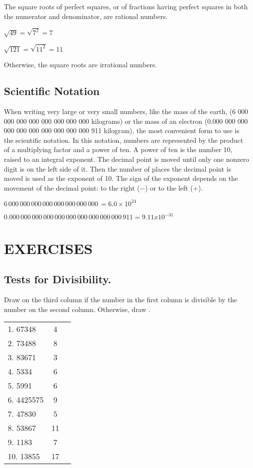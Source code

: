 The square roots of perfect squares, or of fractions having perfect squares in both the
numerator and denominator, are rational numbers.
\begin{example}
\item $\sqrt{49}=\sqrt{7^2}=7$
\item $\sqrt{121}=\sqrt{11^2}=11$
\end{example}
Otherwise, the square roots are irrational numbers.
\subsection*{Scientific Notation}
When writing very large or very small numbers, like the mass of the earth, (6 000
000 000 000 000 000 000 000 kilograms) or the mass of an electron (0.000 000 000 000 000
000 000 000 000 000 911 kilogram), the most convenient form to use is the scientific
notation. In this notation, numbers are represented by the product of a multiplying factor
and a power of ten. A power of ten is the number 10, raised to an integral exponent. The
decimal point is moved until only one nonzero digit is on the left side of it. Then the number
of places the decimal point is moved is used as the exponent of 10. The sign of the exponent
depends on the movement of the decimal point: to the right ($-$) or to the left ($+$).
\begin{example}
\item $6\, 000\, 000\, 000\, 000\, 000\, 000\, 000\, 000\, = 6.0 \times 10^{24}$
\item $0.000\, 000\, 000\, 000\, 000\, 000\, 000\, 000\, 000\, 000\, 911 = 9.11 x 10^{-31}$
\end{example}

\section*{EXERCISES}
\subsection*{Tests for Divisibility.}
Draw {\large\Smiley{}} on the third column if the number in the first column is divisible by the number on the
second column. Otherwise, draw {\large\Frowny{}}.

\noindent
\begin{tabular}{lcl}
1. 67348 & 4 & \hphantom{{\Large\Frowny} answer} \\ \cline{3-3}
2. 73488 & 8 & \\ \cline{3-3}
3. 83671 & 3 & \\ \cline{3-3}
4. 5334 & 6 & \\ \cline{3-3}
5. 5991 & 6 & \\ \cline{3-3}
6. 4425575 & 9 & \\ \cline{3-3}
7. 47830 & 5 & \\ \cline{3-3}
8. 53867 & 11 & \\ \cline{3-3}
9. 1183 & 7 & \\ \cline{3-3}
10. 13855 & 17 & \\ \cline{3-3}
\end{tabular}

